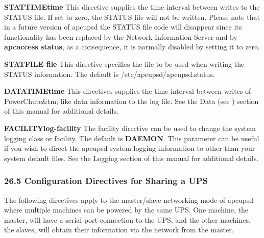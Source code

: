 {{{{{{{{{{{\label{index-Directives-Logging-245}
\label{index-Logging_002c-directives-246}

\begin{description}

\item {\bf STATTIME\lt{}time\gt{}}
This directive supplies the time interval between writes to the STATUS file.
If set to zero, the STATUS file will not be written. Please note that in a
future version of apcupsd the STATUS file code will disappear since its
functionality has been replaced by the Network Information Server and by {\bf
apcaccess status}, as a consequence, it is normally disabled by setting it to
zero.  

\item {\bf STATFILE \lt{}file\gt{}}
This directive specifies the file to be used when writing the STATUS
information. The default is /etc/apcupsd/apcupsd.status.  

\item {\bf DATATIME\lt{}time\gt{}}
This directives supplies the time interval between writes of PowerChute\&tm;
like data information to the log file. See the Data (see 
) section of this manual for
additional details.  

\item {\bf FACILITY\lt{}log-facility\gt{}}
The facility directive can be used to change the system logging class or
facility. The default is {\bf DAEMON}. This parameter can be useful if you
wish to direct the apcupsd system logging information to other than your
system default files. See the Logging section of this manual for additional
details. 
\end{description}

\label{Configuration-Directives-for-Sharing-a-UPS}

\subsubsection*{26.5 Configuration Directives for Sharing a UPS}

\label{index-Directives-Sharing-247}
The following directives apply to the master/slave networking mode of apcupsd
where multiple machines can be powered by the same UPS. One machine, the
master, will have a serial port connection to the UPS, and the other machines,
the slaves, will obtain their information via the network from the master.  

}}}}}}}}}}}
